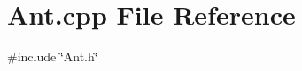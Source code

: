 \section{Ant.\+cpp File Reference}
\label{Ant_8cpp}
{\ttfamily \#include \char`\"{}Ant.\+h\char`\"{}}\newline

